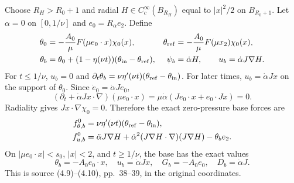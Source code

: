 Choose $R_H>R_0+1$ and radial $H\in C_c^\infty(B_{R_H})$ equal to
$|x|^2/2$ on $B_{R_0+1}$. Let $\alpha=0$ on $[0,1/\nu]$ and
$e_0=R_\alpha e_2$. Define
\begin{align}
 \theta_0&=-\frac{A_0}{\mu}F(\mu e_0\cdot x)\chi_0(x),&
 \theta_{\rm ref}&=-\frac{A_0}{\mu}F(\mu x_2)\chi_0(x),\notag\\
 \theta_b&=\theta_0+(1-\eta(\nu t))
          (\theta_{\rm in}-\theta_{\rm ref}),&
 \psi_b&=\dot\alpha H,\qquad u_b=\dot\alpha J\nabla H.
 \label{cvlane:eq:basephysical}
\end{align}
For $t\leq1/\nu$, $u_b=0$ and
$\partial_t\theta_b=\nu\eta'(\nu t)(\theta_{\rm ref}-\theta_{\rm in})$.
For later times, $u_b=\dot\alpha Jx$ on the support of $\theta_0$.
Since $\dot e_0=\dot\alpha Je_0$,
\[
 (\partial_t+\dot\alpha Jx\cdot\nabla)(\mu e_0\cdot x)
 =\mu\dot\alpha(Je_0\cdot x+e_0\cdot Jx)=0.
\]
Radiality gives $Jx\cdot\nabla\chi_0=0$. Therefore the exact
zero-pressure base forces are
\begin{align}
 f^0_{\theta,b}&=\nu\eta'(\nu t)(\theta_{\rm ref}-\theta_{\rm in}),\notag\\
 f^0_{u,b}&=\ddot\alpha J\nabla H+
 \dot\alpha^2(J\nabla H\cdot\nabla)(J\nabla H)-\theta_b e_2.
 \label{cvlane:eq:baseforces}
\end{align}
On $|\mu e_0\cdot x|<s_0$, $|x|<2$, and $t\geq1/\nu$, the
base has the exact values
\[
 \theta_b=-A_0e_0\cdot x,\quad u_b=\dot\alpha Jx,
 \quad G_b=-A_0e_0,\quad D_b=\dot\alpha J.
\]
This is source (4.9)--(4.10), pp.~38--39, in the original coordinates.

